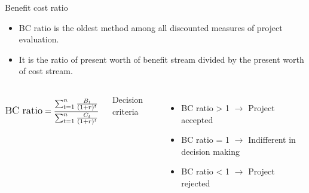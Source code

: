 \documentclass[12pt,ignorenonframetext,aspectratio=169]{beamer}
\providecommand{\tightlist}{%
  \setlength{\itemsep}{0pt}\setlength{\parskip}{0pt}}
\begin{document}
\begin{frame}{Benefit cost ratio}
\protect\hypertarget{benefit-cost-ratio}{}
\begin{itemize}
\tightlist
\item
  BC ratio is the oldest method among all discounted measures of project
  evaluation.
\item
  It is the ratio of present worth of benefit stream divided by the
  present worth of cost stream.
\end{itemize}

\begin{columns}


$$
\large
\textrm{BC ratio} = \frac{\sum_{t = 1}^n{\frac{B_t}{(1 + r)^t}}}{\sum_{t = 1}^n{\frac{C_t}{(1 + r)^t}}}
$$


Decision criteria

\begin{itemize}
\item BC ratio > 1 $\longrightarrow$ Project accepted
\item BC ratio = 1 $\longrightarrow$ Indifferent in decision making
\item BC ratio < 1 $\longrightarrow$ Project rejected
\end{itemize}

\end{columns}
\end{frame}
\end{document}
